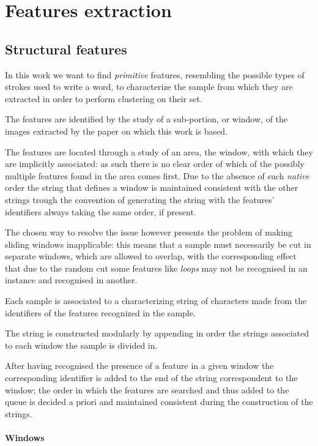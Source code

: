 \section{Features extraction}

\subsection{Structural features}

In this work we want to find \emph{primitive} features, resembling the possible types of strokes used to write a word, to characterize the sample from which they are extracted in order to perform clustering on their set.

The features are identified by the study of a sub-portion, or window, of the images extracted by the paper on which this work is based.

The features are located through a study of an area, the window, with which they are implicitly associated: as such there is no clear order of which of the possibly multiple features found in the area comes first.
Due to the absence of such \emph{native} order the string that defines a window is maintained consistent with the other strings trough the convention of generating the string with the features' identifiers always taking the same order, if present.

The chosen way to resolve the issue however presents the problem of making sliding windows inapplicable: this means that a sample must necessarily be cut in separate windows, which are allowed to overlap, with the corresponding effect that due to the random cut some features like \textit{loops} may not be recognised in an instance and recognised in another. 

Each sample is associated to a characterizing string of characters made from the identifiers of the features recognized in the sample.

The string is constructed modularly by appending in order the strings associated to each window the sample is divided in.

After having recognised the presence of a feature in a given window the corresponding identifier is added to the end of the string correspondent to the window; the order in which the features are searched and thus added to the queue is decided a priori and maintained consistent during the construction of the strings. 


\paragraph{Windows}


